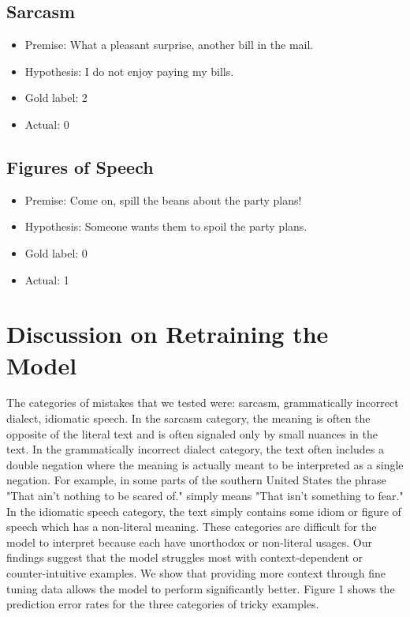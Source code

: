 \documentclass{article}
\begin{document}
\subsection{Sarcasm}
\begin{itemize}
	\item Premise: What a pleasant surprise, another bill in the mail.
	\item Hypothesis: I do not enjoy paying my bills.
	\item Gold label: 2
	\item Actual: 0
\end{itemize}

\subsection{Figures of Speech}
\begin{itemize}
	\item Premise: Come on, spill the beans about the party plans!
	\item Hypothesis: Someone wants them to spoil the party plans.
	\item Gold label: 0
	\item Actual: 1
\end{itemize}

\section{Discussion on Retraining the Model}
The categories of mistakes that we tested were:  sarcasm, grammatically incorrect dialect, idiomatic speech. In the sarcasm
category, the meaning is often the opposite of the literal text and is often signaled only by small nuances in the text.
In the grammatically incorrect dialect category, the text often includes a double negation where the meaning is actually meant
to be interpreted as a single negation. For example, in some parts of the southern United States the phrase
"That ain't nothing to be scared of." simply means "That isn't something to fear." In the idiomatic speech category,
the text simply contains some idiom or figure of speech which has a non-literal meaning. These categories are difficult
for the model to interpret because each have unorthodox or non-literal usages. Our findings suggest that the model
struggles most with context-dependent or counter-intuitive examples. We show that providing more context through fine tuning
data allows the model to perform significantly better. Figure 1 shows the prediction error rates for the three categories of
tricky examples.
\end{document}
